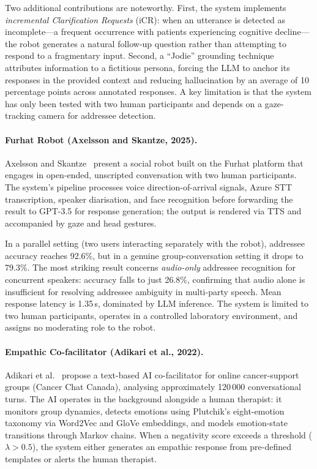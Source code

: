 Two additional contributions are noteworthy.  First, the system implements
\emph{incremental Clarification Requests} (iCR): when an utterance is detected
as incomplete---a frequent occurrence with patients experiencing cognitive
decline---the robot generates a natural follow-up question rather than
attempting to respond to a fragmentary input.  Second, a ``Jodie'' grounding
technique attributes information to a fictitious persona, forcing the LLM to
anchor its responses in the provided context and reducing hallucination by an
average of 10 percentage points across annotated responses.  A key limitation is
that the system has only been tested with two human participants and depends on
a gaze-tracking camera for addressee detection.

\paragraph{Furhat Robot (Axelsson and Skantze, 2025).}
Axelsson and Skantze~\cite{axelsson2025furhat} present a social robot built on
the Furhat platform that engages in open-ended, unscripted conversation with two
human participants.  The system's pipeline processes voice direction-of-arrival
signals, Azure STT transcription, speaker diarisation, and face recognition
before forwarding the result to GPT-3.5 for response generation; the output is
rendered via TTS and accompanied by gaze and head gestures.

In a parallel setting (two users interacting separately with the robot),
addressee accuracy reaches 92.6\%, but in a genuine group-conversation setting
it drops to 79.3\%.  The most striking result concerns \emph{audio-only}
addressee recognition for concurrent speakers: accuracy falls to just 26.8\%,
confirming that audio alone is insufficient for resolving addressee ambiguity in
multi-party speech.  Mean response latency is 1.35\,s, dominated by LLM
inference.  The system is limited to two human participants, operates in a
controlled laboratory environment, and assigns no moderating role to the robot.

\paragraph{Empathic Co-facilitator (Adikari et al., 2022).}
Adikari et al.~\cite{adikari2022empathic} propose a text-based AI
co-facilitator for online cancer-support groups (Cancer Chat Canada), analysing
approximately 120\,000 conversational turns.  The AI operates in the background
alongside a human therapist: it monitors group dynamics, detects emotions using
Plutchik's eight-emotion taxonomy via Word2Vec and GloVe embeddings, and models
emotion-state transitions through Markov chains.  When a negativity score
exceeds a threshold ($\lambda > 0.5$), the system either generates an empathic
response from pre-defined templates or alerts the human therapist.


